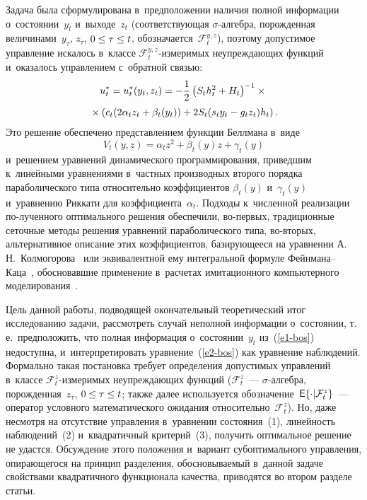 \begin{multicols}{2}
     Задача была сформулирована в~предположении наличия полной 
информации о~состоянии~$y_t$ и~выходе~$z_t$ (соответствующая 
$\sigma$-ал\-геб\-ра, порожденная величинами~$y_\tau$, $z_\tau$, $0\hm\leq 
\tau\hm\leq t$, обозначается~$\mathcal{F}_t^{y,z}$), поэтому допустимое 
управление искалось в~классе  
$\mathcal{F}_t^{y,z}$-из\-ме\-ри\-мых неупреждающих функций и~оказалось 
управлением с~обратной связью:
\begin{multline}
u_t^*=u_t^*(y_t,z_t)= -
\displaystyle\frac{\displaystyle 1\mathstrut}{\displaystyle 2\mathstrut}\left( S_th_t^2+H_t\right)^{-1}\times {}\\
{}\times \left( c_t(2\alpha_tz_t+\beta_t(y_t))+2S_t(s_ty_t-g_tz_t)h_t\right).
\label{e4-bos}
\end{multline}
     Это решение обеспечено представлением функции Беллмана в~виде 
$$
V_t(y,z)= \alpha_tz^2+\beta_t(y)z+\gamma_t(y)$$ 
и~решением 
уравнений динамического программирования, приведшим к~линейными 
уравнениями в~частных производных второго порядка параболического типа 
относительно коэффициентов $\beta_t(y)$ и~$\gamma_t(y)$  и~уравнению 
Риккати для коэффициента~$\alpha_t$. Подходы к~численной реализации 
по-\linebreak лученного оптимального решения обеспечили, во-пер\-вых, традиционные 
сеточные методы решения уравнений параболического типа, во-вто\-рых, 
альтернативное описание этих коэффициентов, базирующееся на уравнении 
А.\,Н.~Колмогорова~\cite{6-bos} или эквивалентной ему интегральной 
формуле Фейнмана--Каца~\cite{7-bos}, обосновавшие применение 
в~расчетах имитационного компьютерного моделирования~\cite{4-bos}.
     
     Цель данной работы, подводящей окончательный теоретический итог 
исследованию задачи, рассмотреть случай неполной информации 
о~состоянии, т.\,е.\ предположить, что полная информация 
о~состоянии~$y_t$ из~(\ref{e1-bos}) недоступна, и~интерпретировать 
уравнение~(\ref{e2-bos}) как уравнение наблюдений. Формально такая 
постановка требует определения допустимых управлений в~классе 
$\mathcal{F}_t^z$-из\-ме\-ри\-мых неупреждающих функций 
($\mathcal{F}_t^z$~--- $\sigma$-ал\-геб\-ра, по\-рож\-ден\-ная~$z_\tau$, 
$0\hm\leq \tau\hm\leq t$; также 
далее используется обозначение~${\sf E}\{\cdot\vert \mathcal{F}_t^z\}$~--- 
оператор условного математического ожидания 
относительно~$\mathcal{F}_t^z$). Но, даже несмотря на отсутствие 
управления в~уравнении состояния~(1), линейность наблюдений~(2) 
и~квад\-ра\-тич\-ный критерий~(3), получить оптимальное решение не удастся. 
Обсуждение этого положения и~вариант субоптимального управ\-ле\-ния, 
опи\-ра\-юще\-го\-ся на принцип разделения, обосно\-вы\-ва\-емый в~данной задаче 
свойствами квадратичного функционала качества, приводятся во втором 
разделе статьи. 
     

\end{multicols}
